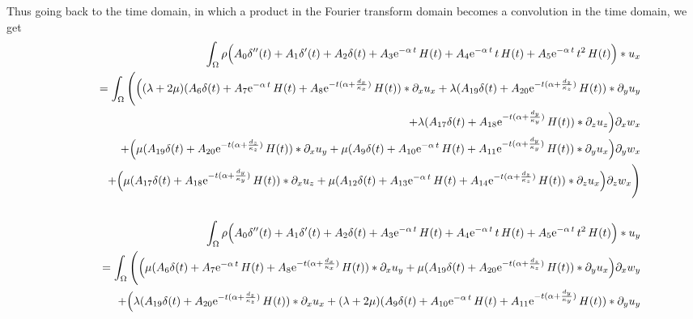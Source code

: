 \documentclass[onecolumn,extra]{gji_modified_cours_UPPA}
\begin{document}
Thus going back to the time domain, in which a product in the Fourier transform domain becomes a convolution in the time domain, we get
%
\begin{eqnarray}
%
&&\int_\Omega \rho \Big(A_0 \delta''(t) + A_1 \delta'(t) + A_2 \delta(t)
+ A_3 {\rm e}^{-\alpha\,t} \, H(t)
+ A_4 {\rm e}^{-\alpha\,t} \,t\, H(t)
+ A_5 {\rm e}^{-\alpha\,t} \,t^{2} \,H(t)\Big) \ast u_x \nonumber  \\
&& =  \int_\Omega \Bigg(\Big((\lambda + 2 \mu)(A_6\delta(t) + A_7 {\rm e}^{-\alpha\,t} \, H(t) + A_8 {\rm e}^{-t(\alpha+\frac{d_x}{\kappa_x})} \, H(t))\ast\partial_x u_x
+\lambda (A_{19}\delta(t) + A_{20} {\rm e}^{-t(\alpha+\frac{d_z}{\kappa_z})} \, H(t)) \ast \partial_y u_y \nonumber\\
&&\,\,\,\,\,\,\,\,\,\,\,\,\,\,\,\,\,\,\,\,\,\,\,\,\, + \lambda (A_{17}\delta(t) + A_{18} {\rm e}^{-t(\alpha+\frac{d_y}{\kappa_y})} \, H(t))\ast \partial_z u_z\Big) \partial_x w_x\nonumber\\
&&\,\,\,\,\,\,\,\,\,\,\,\,\,\,\,+ \Big(\mu (A_{19}\delta(t) + A_{20} {\rm e}^{-t(\alpha+\frac{d_z}{\kappa_z})} \, H(t)) \ast \partial_x u_y
+ \mu (A_9\delta(t) + A_{10} {\rm e}^{-\alpha\,t} \, H(t) + A_{11} {\rm e}^{-t(\alpha+\frac{d_y}{\kappa_y})} \, H(t) ) \ast\partial_y u_x\Big) \partial_y w_x   \nonumber  \\
&&\,\,\,\,\,\,\,\,\,\,\,\,\,\,\,+ \Big(\mu (A_{17}\delta(t) + A_{18} {\rm e}^{-t(\alpha+\frac{d_y}{\kappa_y})} \, H(t))\ast \partial_x u_z
+ \mu (A_{12}\delta(t) + A_{13} {\rm e}^{-\alpha\,t} \, H(t) + A_{14} {\rm e}^{-t(\alpha+\frac{d_z}{\kappa_z})} \, H(t))\ast\partial_z u_x\Big) \partial_z w_x \Bigg) \nonumber \\ \nonumber \\
%
&&\int_\Omega \rho \Big(A_0 \delta''(t) + A_1 \delta'(t) + A_2 \delta(t)
+ A_3 {\rm e}^{-\alpha\,t} \, H(t)
+ A_4 {\rm e}^{-\alpha\,t} \,t\, H(t)
+ A_5 {\rm e}^{-\alpha\,t} \,t^{2} \,H(t)\Big) \ast u_y \nonumber  \\
&&=  \int_\Omega \Bigg(\Big(\mu (A_6\delta(t) + A_7 {\rm e}^{-\alpha\,t} \, H(t) + A_8 {\rm e}^{-t(\alpha+\frac{d_x}{\kappa_x})} \, H(t) )\ast \partial_x u_y
+ \mu (A_{19}\delta(t) + A_{20} {\rm e}^{-t(\alpha+\frac{d_z}{\kappa_z})} \, H(t)) \ast\partial_y u_x \Big)\partial_x w_y \nonumber\\
&&\,\,\,\,\,\,\,\,\,\,\,\,\,\,\,+ \Big(\lambda (A_{19}\delta(t) + A_{20} {\rm e}^{-t(\alpha+\frac{d_z}{\kappa_z})} \, H(t)) \ast \partial_x u_x
+ (\lambda + 2 \mu)(A_9\delta(t) + A_{10} {\rm e}^{-\alpha\,t} \, H(t) + A_{11} {\rm e}^{-t(\alpha+\frac{d_y}{\kappa_y})} \, H(t) )\ast\partial_y u_y\nonumber\\

\end{eqnarray}
\end{document}
